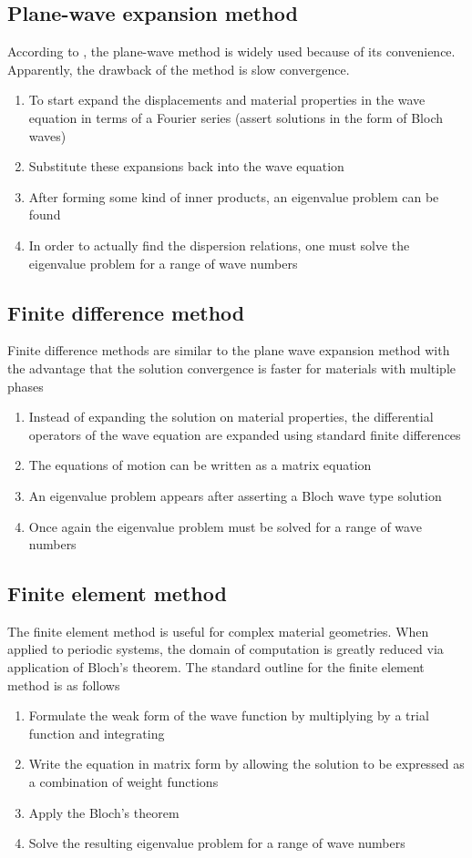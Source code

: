 \documentclass{article}
\begin{document}
\subsection{Plane-wave expansion method}
According to \cite{cao04}, the plane-wave method is widely used because of its 
convenience. Apparently, the drawback of the method is slow convergence.
\begin{enumerate}
	\item To start expand the displacements and material properties in the wave 
	equation in terms of a Fourier series (assert solutions in the form of 
	Bloch waves)
	\item Substitute these expansions back into the wave equation
	\item After forming some kind of inner products, an eigenvalue problem can 
	be found
	\item In order to actually find the dispersion relations, one must solve 
	the eigenvalue problem for a range of wave numbers
\end{enumerate}

\subsection{Finite difference method}
Finite difference methods are similar to the plane wave expansion method with 
the advantage that the solution convergence is faster for materials with 
multiple phases
\begin{enumerate}
	\item Instead of expanding the solution on material properties, the 
	differential operators of the wave equation are expanded using standard 
	finite differences
	\item The equations of motion can be written as a matrix equation
	\item An eigenvalue problem appears after asserting a Bloch wave type 
	solution
	\item Once again the eigenvalue problem must be solved for a range of wave 
	numbers
\end{enumerate}

\subsection{Finite element method}
The finite element method is useful for complex material geometries. When 
applied to periodic systems, the domain of computation is greatly reduced via 
application of Bloch's theorem. The standard outline for the finite element 
method is as follows
\begin{enumerate}
	\item Formulate the weak form of the wave function by multiplying by a 
	trial function and integrating
	\item Write the equation in matrix form by allowing the solution to be 
	expressed as a combination of weight functions
	\item Apply the Bloch's theorem
	\item Solve the resulting eigenvalue problem for a range of wave numbers
\end{enumerate}
\end{document}
